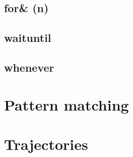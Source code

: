 \subsection{for\& (n)}
\subsection{waituntil}
\subsection{whenever}

\FloatBarrier
\section{Pattern matching}
\FloatBarrier
\section{Trajectories}

